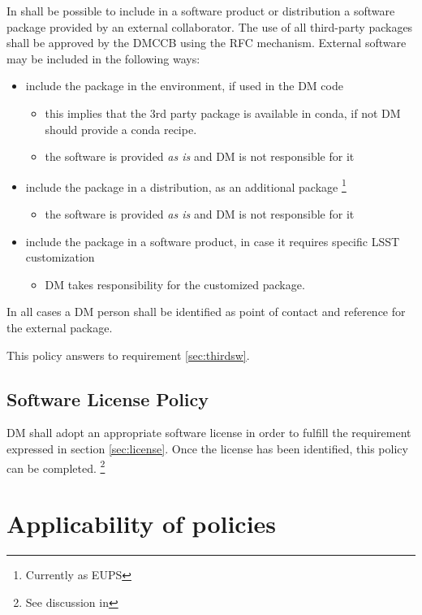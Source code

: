 In shall be possible to include in a software product or distribution a software package provided by an external collaborator.
The use of all third-party packages shall be approved by the DMCCB using the RFC mechanism.
External software may be included in the following ways:

\begin{itemize}
\item include the package in the environment, if used in the DM code
    \begin{itemize}
    \item this implies that the 3rd party package is available in conda, if not DM should provide a conda recipe.
    \item the software is provided \textit{as is} and DM is not responsible for it
    \end{itemize}
\item include the package in a distribution, as an additional  package \footnote{Currently as EUPS}
    \begin{itemize}
    \item the software is provided \textit{as is} and DM is not responsible for it
    \end{itemize}
\item include the package in a software product, in case it requires specific LSST customization
    \begin{itemize}
    \item DM takes responsibility for the customized package.
    \end{itemize}
\end{itemize}

In all cases a DM person shall be identified as point of contact and reference for the external package.

This policy answers to requirement \ref{sec:thirdsw}.


\subsection{Software License Policy} \label{sec:licensepolicy}

DM shall adopt an appropriate software license in order to fulfill the requirement expressed in section \ref{sec:license}.
Once the license has been identified, this policy can be completed.
\footnote{See discussion in }


\newpage
\section{Applicability of policies } \label{sec:applicability}

